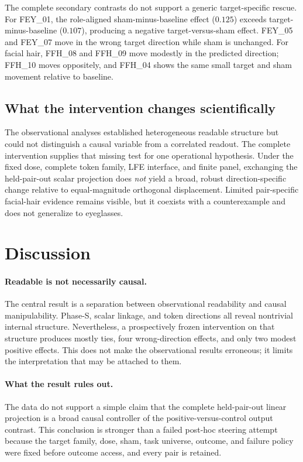 \documentclass[10pt,twocolumn,letterpaper]{article}
\begin{document}
The complete secondary contrasts do not support a generic target-specific rescue.  For FEY\_01, the role-aligned sham-minus-baseline effect ($0.125$) exceeds target-minus-baseline ($0.107$), producing a negative target-versus-sham effect.  FEY\_05 and FEY\_07 move in the wrong target direction while sham is unchanged.  For facial hair, FFH\_08 and FFH\_09 move modestly in the predicted direction; FFH\_10 moves oppositely, and FFH\_04 shows the same small target and sham movement relative to baseline.

\subsection{What the intervention changes scientifically}

The observational analyses established heterogeneous readable structure but could not distinguish a causal variable from a correlated readout.  The complete intervention supplies that missing test for one operational hypothesis.  Under the fixed dose, complete token family, LFE interface, and finite panel, exchanging the held-pair-out scalar projection does \emph{not} yield a broad, robust direction-specific change relative to equal-magnitude orthogonal displacement.  Limited pair-specific facial-hair evidence remains visible, but it coexists with a counterexample and does not generalize to eyeglasses.

\section{Discussion}
\label{sec:discussion}

\paragraph{Readable is not necessarily causal.}
The central result is a separation between observational readability and causal manipulability.  Phase-S, scalar linkage, and token directions all reveal nontrivial internal structure.  Nevertheless, a prospectively frozen intervention on that structure produces mostly ties, four wrong-direction effects, and only two modest positive effects.  This does not make the observational results erroneous; it limits the interpretation that may be attached to them.

\paragraph{What the result rules out.}
The data do not support a simple claim that the complete held-pair-out linear projection is a broad causal controller of the positive-versus-control output contrast.  This conclusion is stronger than a failed post-hoc steering attempt because the target family, dose, sham, task universe, outcome, and failure policy were fixed before outcome access, and every pair is retained.
\end{document}
